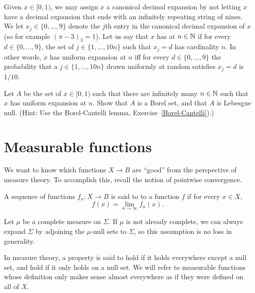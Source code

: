 \begin{exercise}
Given $x \in [0, 1)$, we may assign $x$ a canonical decimal expansion by not letting $x$ have a decimal expansion that ends with an infinitely repeating string of nines.
We let $x_{j} \in \{0, \dots, 9\}$ denote the $j$th entry in the canonical decimal expansion of $x$ (so for example $(\pi - 3)_3 = 1$).
Let us say that $x$ has  at $n \in \mathbb{N}$ if for every $d \in \{0, \dots, 9\}$, the set of $j \in \{1, \dots, 10n\}$ such that $x_{j} = d$ has cardinality $n$.
In other words, $x$ has uniform expansion at $n$ iff for every $d \in \{0, \dots, 9\}$ the probability that a $j \in \{1, \dots, 10n\}$ drawn uniformly at random satisfies $x_{j} = d$ is $1/10$.

Let $A$ be the set of $x \in [0, 1)$ such that there are infinitely many $n \in \mathbb{N}$ such that $x$ has uniform expansion at $n$.
Show that $A$ is a Borel set, and that $A$ is Lebesgue null. (Hint: Use the Borel-Cantelli lemma, Exercise~\ref{Borel-Cantelli}).)
\end{exercise}



\section{Measurable functions}
We want to know which functions $X \to B$ are ``good'' from the perspective of measure theory. To accomplish this, recall the notion of pointwise convergence.

\begin{definition}
A sequence of functions $f_{n}: X \to B$ is said to  to a function $f$ if for every $x \in X$,
\[f(x) = \lim_{n \to \infty} f_{n}(x).\]
\end{definition}

\begin{subsec}
Let $\mu$ be a complete measure on $\Sigma$.
If $\mu$ is not already complete, we can always expand $\Sigma$ by adjoining the $\mu$-null sets to $\Sigma$, so this assumption is no loss in generality.
\end{subsec}

\begin{subsec}
In measure theory, a property is said to hold  if it holds everywhere except a null set, and hold  if it only holds on a null set.
We will refer to measurable functions whose definition only makes sense almost everywhere as if they were defined on all of $X$.
\end{subsec}


